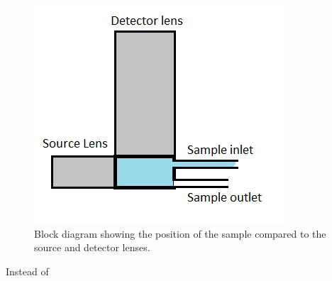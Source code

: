 \begin{figure}[h]
	\centering
	\includegraphics[width=\textwidth]{figures/XRF/SampleDiagram.png}
	\caption{Block diagram showing the position of the sample compared to the source and detector lenses.}
	\label{fig:XRFSampleDiagram}
\end{figure}

Instead of 
